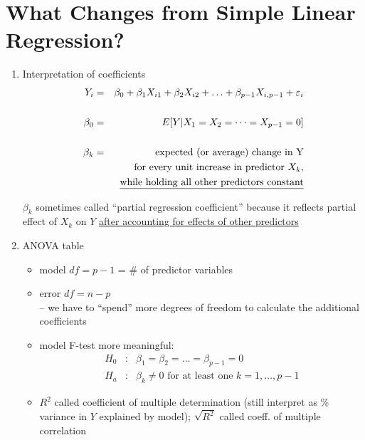 \documentclass[12pt]{notes}
\begin{document}
\section{What Changes from Simple Linear Regression?}
\begin{enumerate}
\item Interpretation of coefficients
\begin{eqnarray}
  Y_i & = & \beta_0 + \beta_1 X_{i1} + \beta_2 X_{i2} + \ldots + \beta_{p-1} X_{i,p-1} + \varepsilon_i \nonumber \\
   & & \nonumber \\
\beta_0 & = & E[Y | X_1=X_2=\cdots=X_{p-1}=0] \nonumber \\
& & \nonumber \\
\beta_k & = & \mbox{expected (or average) change in Y} \nonumber \\
  & & \mbox{for every unit increase in predictor $X_k$,}\nonumber\\
  & & \mbox{\underline{while holding all other predictors constant}}\nonumber
\end{eqnarray}

\begin{minipage}[l][1cm][c]{\textwidth}
\end{minipage}

$\beta_k$ sometimes called ``partial regression coefficient''
because it reflects partial effect of $X_k$ on $Y$ \underline{after
accounting for effects of other predictors}\\

\item ANOVA table
\begin{itemize}
  \item model $df = p-1$ = \# of predictor variables
  \item error $df = n-p$\\
        -- we have to ``spend'' more degrees of freedom to calculate the additional coefficients
  \item model F-test more meaningful:
        \begin{eqnarray}
          H_0 & : & \beta_1 = \beta_2 = \ldots = \beta_{p-1} = 0   \nonumber \\
          H_a & : & \beta_k \neq 0 \mbox{ for at least one } k=1,\ldots,p-1 \nonumber
        \end{eqnarray}
  \item $R^2$ called coefficient of multiple determination (still interpret as \% variance in $Y$ explained by model);
        $\sqrt{R^2}$ called coeff. of multiple correlation
\end{itemize}


\end{enumerate}
\end{document}

